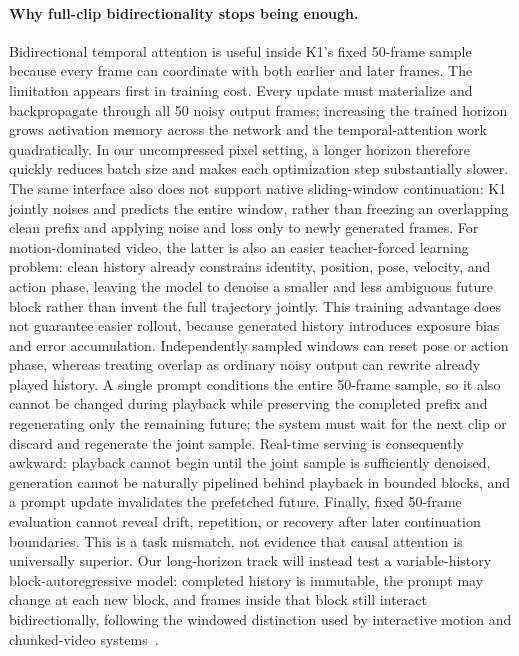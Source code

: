 \documentclass[10pt,twocolumn]{article}
\begin{document}
\paragraph{Why full-clip bidirectionality stops being enough.} Bidirectional temporal attention is useful inside
K1's fixed 50-frame sample because every frame can coordinate with both earlier and later frames. The limitation
appears first in training cost. Every update must materialize and backpropagate through all 50 noisy output frames;
increasing the trained horizon grows activation memory across the network and the temporal-attention work
quadratically. In our uncompressed pixel setting, a longer horizon therefore quickly reduces batch size and makes each
optimization step substantially slower. The same interface also does not support native sliding-window continuation:
K1 jointly noises and predicts the entire window, rather than freezing an overlapping clean prefix and applying noise
and loss only to newly generated frames. For motion-dominated video, the latter is also an easier teacher-forced
learning problem: clean history already constrains identity, position, pose, velocity, and action phase, leaving the
model to denoise a smaller and less ambiguous future block rather than invent the full trajectory jointly. This
training advantage does not guarantee easier rollout, because generated history introduces exposure bias and error
accumulation. Independently sampled windows can reset pose or action phase, whereas treating overlap as ordinary noisy
output can rewrite already played history. A single prompt conditions the entire 50-frame
sample, so it also cannot be changed during playback while preserving the completed prefix and regenerating only the
remaining future; the system must wait for the next clip or discard and regenerate the joint sample. Real-time serving
is consequently awkward: playback cannot begin until the joint sample is sufficiently denoised, generation cannot be
naturally pipelined behind playback in bounded blocks, and a prompt update invalidates the prefetched future. Finally,
fixed 50-frame evaluation cannot reveal drift, repetition, or recovery after later continuation boundaries. This is a
task mismatch, not evidence that causal attention is universally superior. Our long-horizon track will instead test a
variable-history block-autoregressive model: completed history is immutable, the prompt may change at each new block,
and frames inside that block still interact bidirectionally, following the windowed distinction used by interactive
motion and chunked-video systems~\cite{zhao2026ardy,magi2025}.
\end{document}
